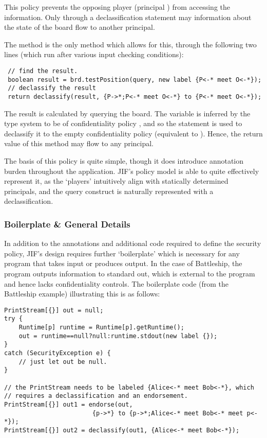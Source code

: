  This policy prevents the opposing player (principal ) from accessing the information. Only through a declassification statement may information about the state of the board flow to another principal.
 
 The  method is the only method which allows for this, through the following two lines (which run after various input checking conditions):
 
 \begin{verbatim}
 // find the result.
 boolean result = brd.testPosition(query, new label {P<-* meet O<-*});
 // declassify the result
 return declassify(result, {P->*;P<-* meet O<-*} to {P<-* meet O<-*});
 \end{verbatim}
 
 The result is calculated by querying the board. The  variable is inferred by the type system to be of confidentiality policy , and so the  statement is used to declassify it to the empty confidentiality policy \jiflabel{} (equivalent to \jiflabel{\_->\_}). Hence, the return value of this method may flow to any principal.
 
 The basis of this policy is quite simple, though it does introduce annotation burden throughout the application. JIF's policy model is able to quite effectively represent it, as the `players' intuitively align with statically determined principals, and the query construct is naturally represented with a declassification.

\subsubsection{Boilerplate \& General Details}

In addition to the annotations and additional code required to define the security policy, JIF's design requires further `boilerplate' which is necessary for any program that takes input or produces output. In the case of Battleship, the program outputs information to standard out, which is external to the program and hence lacks confidentiality controls. The boilerplate code (from the Battleship example) illustrating this is as follows:

\begin{verbatim}
PrintStream[{}] out = null;
try {
	Runtime[p] runtime = Runtime[p].getRuntime();
	out = runtime==null?null:runtime.stdout(new label {});
}
catch (SecurityException e) {
	// just let out be null.
}

// the PrintStream needs to be labeled {Alice<-* meet Bob<-*}, which
// requires a declassification and an endorsement.
PrintStream[{}] out1 = endorse(out, 
		   				{p->*} to {p->*;Alice<-* meet Bob<-* meet p<-*});
PrintStream[{}] out2 = declassify(out1, {Alice<-* meet Bob<-*});
\end{verbatim}

